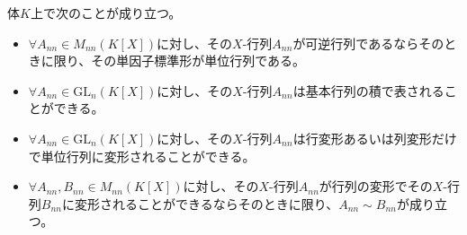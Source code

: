 \documentclass[dvipdfmx]{jsarticle}
\begin{document}
\begin{thm}\label{2.2.8.8}
体$K$上で次のことが成り立つ。
\begin{itemize}
\item
  $\forall A_{nn} \in M_{nn}\left( K[ X] \right)$に対し、その$X$-行列$A_{nn}$が可逆行列であるならそのときに限り、その単因子標準形が単位行列である。
\item
  $\forall A_{nn} \in {\mathrm{GL}}_{n}\left( K[ X] \right)$に対し、その$X$-行列$A_{nn}$は基本行列の積で表されることができる。
\item
  $\forall A_{nn} \in {\mathrm{GL}}_{n}\left( K[ X] \right)$に対し、その$X$-行列$A_{nn}$は行変形あるいは列変形だけで単位行列に変形されることができる。
\item
  $\forall A_{nn},B_{nn} \in M_{nn}\left( K[ X] \right)$に対し、その$X$-行列$A_{nn}$が行列の変形でその$X$-行列$B_{nn}$に変形されることができるならそのときに限り、$A_{nn} \sim B_{nn}$が成り立つ。
\end{itemize}
\end{thm}
\end{document}
